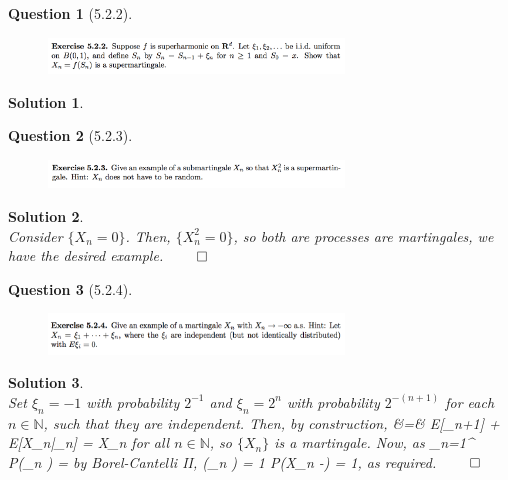 \documentclass[11pt]{article}
\theoremstyle{plain}
\def\eQb#1\eQe{\begin{eqnarray*}#1\end{eqnarray*}}
\theoremstyle{quest}
\newtheorem*{question}{Question}
\newtheorem*{solution}{Solution}
\begin{document}
\newpage

\begin{question}[5.2.2]
\hfill
\begin{figure}[h!]
  \centering
    \includegraphics[width=0.7\textwidth]{d-5-2-2.png}
\end{figure}
\end{question}
\begin{solution} \hfill \\
\end{solution}

\newpage

\begin{question}[5.2.3]
\hfill
\begin{figure}[h!]
  \centering
    \includegraphics[width=0.7\textwidth]{d-5-2-3.png}
\end{figure}
\end{question}
\begin{solution} \hfill \\
Consider $\{X_n = 0\}$. Then, $\{X_n^2 = 0\}$, so both are processes are martingales, 
we have the desired example. \hfill $\qed$
\end{solution}

\newpage

\begin{question}[5.2.4]
\hfill
\begin{figure}[h!]
  \centering
    \includegraphics[width=0.7\textwidth]{d-5-2-4.png}
\end{figure}
\end{question}
\begin{solution} \hfill \\
Set $\xi_n = -1$ with probability $2^{-1}$ and $\xi_n = 2^{n}$ with probability
$2^{-(n+1)}$ 
for each $n \in \mathbb{N}$, such that they are independent. Then, by construction, 
\eQb
E[X_{n+1}| \mathscr{F}_n] &=& E[\xi_{n+1}] + E[X_n|_n] = X_n
\eQe
for all $n \in \mathbb{N}$, so $\{X_n\}$ is a martingale. Now, as
\eQb
\sum_{n=1}^{\infty} P(\xi_n ) = \infty
\eQe
by Borel-Cantelli II,
\eQb
P(\xi_n  \>\>\>  ) = 1 \>\>\>  \>\>\> P(X_n \to -\infty) = 1,
\eQe
as required. \hfill $\qed$
\end{solution}
\end{document}
